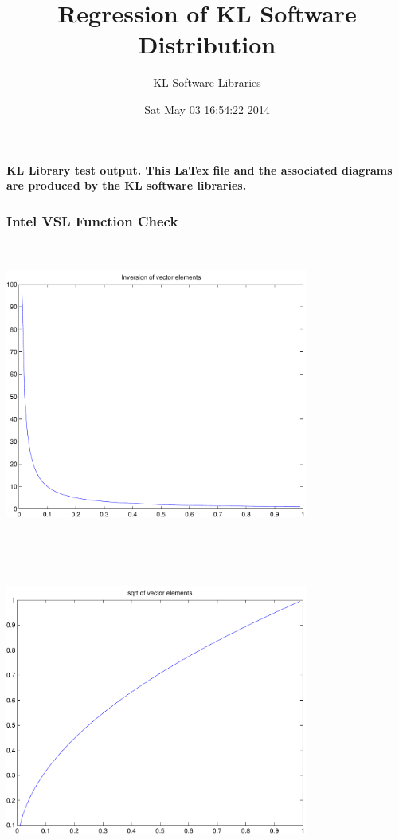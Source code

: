\documentclass[9pt]{article}
\theoremstyle{plain}
\theoremstyle{definition}
\theoremstyle{remark}
\numberwithin{equation}{section}
\begin{document}
\title{Regression of KL Software Distribution   }
\author{KL Software Libraries}
\date{Sat May 03 16:54:22 2014
}
\maketitle
\textbf{ KL Library test output.  This LaTex file and the associated diagrams are produced by the KL software libraries.}
\subsubsection{Intel VSL Function Check}
\includegraphics[width=10.0cm,height=10.0cm]{klVSLInv.pdf}

\includegraphics[width=10.0cm,height=10.0cm]{klVSLSqrt.pdf}
\end{document}
